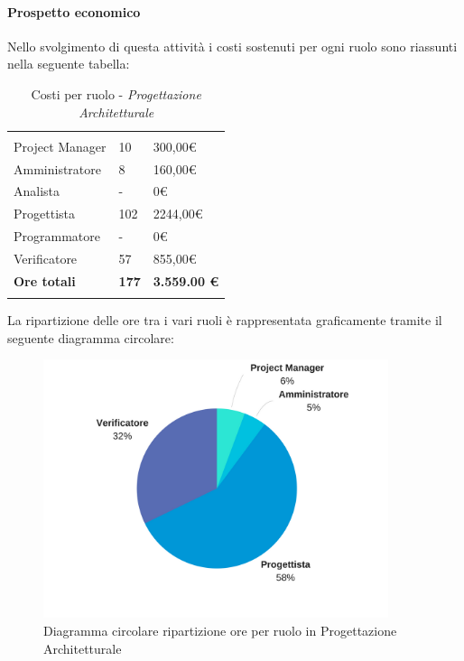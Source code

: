 			\paragraph{Prospetto economico} \Spazio
			Nello svolgimento di questa attività i costi sostenuti per ogni ruolo sono riassunti nella seguente tabella:
			\begin{table}[H]
			\centering
			\begin{tabular}{|p{4cm}|C{4cm}|C{4cm}|}
				
				 & &\\
				Project Manager & 10 & 300,00\euro \\
				\hline
				Amministratore& 8 & 160,00\euro \\
				\hline
				Analista & - & 0\euro \\
				\hline
				Progettista & 102 & 2244,00\euro \\
				\hline
				Programmatore & - & 0\euro \\
				\hline
				Verificatore & 57 & 855,00\euro \\
				\hline
				\textbf{Ore totali} & \textbf{177} & \textbf{3.559.00 \euro} \\
			\end{tabular}
			\caption{Costi per ruolo - \textit{Progettazione Architetturale}}
		\end{table}
		
		La ripartizione delle ore tra i vari ruoli è rappresentata graficamente tramite il seguente diagramma circolare:
		
		\begin{figure}[H] 
			\centering 
			\includegraphics[width=0.9\textwidth]{images/CircolareProgettazioneArchitetturale.png} 
			\caption{Diagramma circolare ripartizione ore per ruolo in Progettazione Architetturale}
			\label{CircolareProgettazioneArchitetturale}
		\end{figure}		

